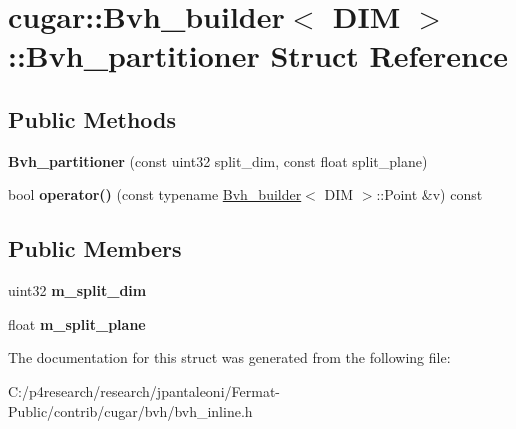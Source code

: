 \hypertarget{structcugar_1_1_bvh__builder_1_1_bvh__partitioner}{}\section{cugar\+:\+:Bvh\+\_\+builder$<$ D\+IM $>$\+:\+:Bvh\+\_\+partitioner Struct Reference}
\label{structcugar_1_1_bvh__builder_1_1_bvh__partitioner}
\subsection*{Public Methods}
\begin{DoxyCompactItemize}
\item 
\mbox{\label{structcugar_1_1_bvh__builder_1_1_bvh__partitioner_a395cee39324362baffbc146dedf9d52f}} 
{\bfseries Bvh\+\_\+partitioner} (const uint32 split\+\_\+dim, const float split\+\_\+plane)
\item 
\mbox{\label{structcugar_1_1_bvh__builder_1_1_bvh__partitioner_aa9abe65e3db65cdf8a127e989b80129e}} 
bool {\bfseries operator()} (const typename \hyperlink{classcugar_1_1_bvh__builder}{Bvh\+\_\+builder}$<$ D\+IM $>$\+::Point \&v) const
\end{DoxyCompactItemize}
\subsection*{Public Members}
\begin{DoxyCompactItemize}
\item 
\mbox{\label{structcugar_1_1_bvh__builder_1_1_bvh__partitioner_a8500c6d90925d63424c34af71331fd46}} 
uint32 {\bfseries m\+\_\+split\+\_\+dim}
\item 
\mbox{\label{structcugar_1_1_bvh__builder_1_1_bvh__partitioner_a7a4d097b92def6f147b8580827409e7e}} 
float {\bfseries m\+\_\+split\+\_\+plane}
\end{DoxyCompactItemize}


The documentation for this struct was generated from the following file\+:\begin{DoxyCompactItemize}
\item 
C\+:/p4research/research/jpantaleoni/\+Fermat-\/\+Public/contrib/cugar/bvh/bvh\+\_\+inline.\+h\end{DoxyCompactItemize}
